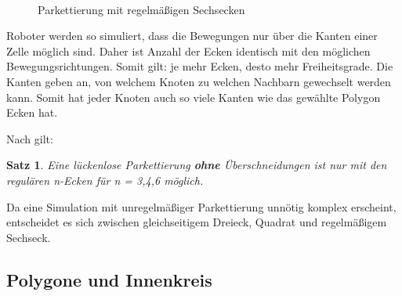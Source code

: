 \documentclass{article}
\newtheorem{satz}{Satz}
\begin{document}
\begin{figure}[!ht]
  \centering
  \qquad
  \\
  \caption{Parkettierung mit regelmäßigen Sechsecken}
  \label{fig:tess_hexagon}
\end{figure}

Roboter werden so simuliert, dass die Bewegungen nur über die Kanten einer
Zelle möglich sind. Daher ist Anzahl der Ecken identisch mit den möglichen
Bewegungsrichtungen. Somit gilt: je mehr Ecken, desto mehr Freiheitsgrade.
Die Kanten geben an, von welchem Knoten zu welchen Nachbarn gewechselt werden
kann. Somit hat jeder Knoten auch so viele Kanten wie das gewählte Polygon
Ecken hat.

Nach \cite[S. 12]{hartfeldt2002} gilt: 
\newline
\begin{satz} 
Eine lückenlose Parkettierung \textbf{ohne} Überschneidungen ist nur mit den 
regulären n-Ecken für n = 3,4,6 möglich.
\end{satz}

Da eine Simulation mit unregelmäßiger Parkettierung unnötig komplex erscheint,
entscheidet es sich zwischen gleichseitigem Dreieck, Quadrat und regelmäßigem Sechseck.

\subsection{Polygone und Innenkreis}
\end{document}
